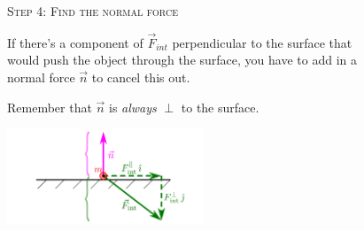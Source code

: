 \documentclass[10pt,letterpaper,twoside]{article}
\begin{document}
\begin{figure}[h!]
  \begin{minipage}[l]{0.70\textwidth}
	{\Large\textsc{Step 4}:} {\large\textsc{Find the normal force}}{\quad}

	If there's a component of $\vec F_{int}$ perpendicular to the surface that would push the object through the surface, you have to add in a normal force $\vec n$ to cancel this out.

	\vspace{10pt}
	Remember that $\vec n$ is \textit{always} $\perp$ to the surface.
  \end{minipage}
  \begin{minipage}[l]{0.25\textwidth}
	\includegraphics[keepaspectratio=true,width=2.30in]{./how_to_normal_force_and_friction_f04.pdf}
    \label{fig:04}
  \end{minipage}
\end{figure}
\FloatBarrier
\end{document}
